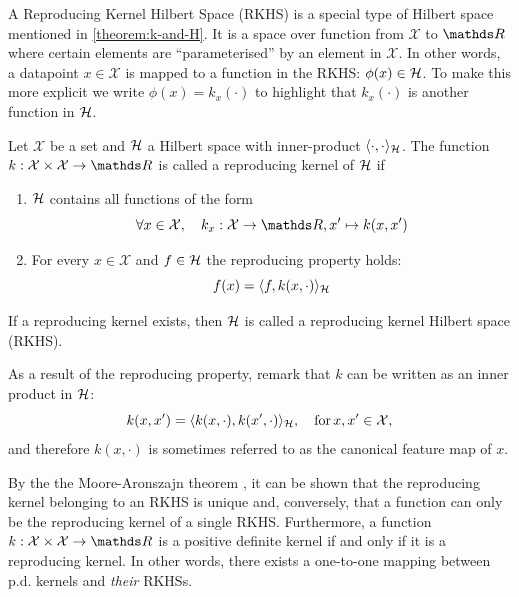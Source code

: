 A Reproducing Kernel Hilbert Space (RKHS) is a special type of Hilbert space mentioned in \cref{theorem:k-and-H}. It is a space over function from $\mathcal{X}$ to $\Reals$ where certain elements are ``parameterised'' by an element in $\mathcal{X}$. In other words, a datapoint $x \in \mathcal{X}$ is mapped to a function in the RKHS: $\phi(x) \in {\mathcal{H}}$. To make this more explicit we write $\phi(x) = k_x(\cdot)$ to highlight that $k_x(\cdot)$ is another function in ${\mathcal{H}}$.
\begin{definition}
  \label{def:rkhs}
  Let $\mathcal{X}$ be a set and ${\mathcal{H}}$ a Hilbert space with inner-product $\langle \cdot, \cdot \rangle_{{\mathcal{H}}}$. The function $k: \mathcal{X} \times \mathcal{X} \rightarrow \Reals$ is called a reproducing kernel of ${\mathcal{H}}$ if
  \begin{enumerate}
    \item ${\mathcal{H}}$ contains all functions of the form
    \begin{equation}
      \forall x \in \mathcal{X},\quad k_x: \mathcal{X} \rightarrow \Reals, x' \mapsto k(x, x')
    \end{equation}
    \item For every $x \in \mathcal{X}$ and $f \in {\mathcal{H}}$ the reproducing property holds:
    \begin{equation}
      f(x) = \langle f, k(x, \cdot) \rangle_{{\mathcal{H}}}
    \end{equation}
  \end{enumerate}
If a reproducing kernel exists, then ${\mathcal{H}}$ is called a reproducing kernel Hilbert space (RKHS).
\end{definition}
As a result of the reproducing property, remark that $k$ can be written as an inner product in ${\mathcal{H}}$:
\begin{equation}
  k(x, x') = \langle k(x, \cdot), k(x', \cdot) \rangle_{{\mathcal{H}}},\quad\text{for}\,x,x'\in\mathcal{X},
\end{equation}
and therefore $k(x, \cdot)$ is sometimes referred to as the canonical feature map of $x$.


By the the Moore-Aronszajn theorem \citep{aronszajn1950theory}, it can be shown that the reproducing kernel belonging to an RKHS is unique and, conversely, that a function can only be the reproducing kernel of a single RKHS. Furthermore, a function $k:\mathcal{X} \times \mathcal{X} \rightarrow \Reals$ is a positive definite kernel if and only if it is a reproducing kernel. In other words, there exists a one-to-one mapping between p.d. kernels and \emph{their} RKHSs.

